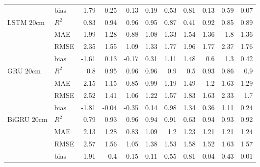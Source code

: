 \begin{tabular}{llrrrrrrrrr}
                                     & bias  & -1.79 & -0.25 & -0.13 & 0.19 & 0.53 &  0.81 & 0.13 & 0.59 &      0.07 \\
 LSTM 20cm                           & $R^2$ &  0.83 &  0.94 &  0.96 & 0.95 & 0.87 &  0.41 & 0.92 & 0.85 &      0.89 \\
                                     & MAE   &  1.99 &  1.28 &  0.88 & 1.08 & 1.33 &  1.54 & 1.36 & 1.8  &      1.36 \\
                                     & RMSE  &  2.35 &  1.55 &  1.09 & 1.33 & 1.77 &  1.96 & 1.77 & 2.37 &      1.76 \\
                                     & bias  & -1.61 &  0.13 & -0.17 & 0.31 & 1.11 &  1.48 & 0.6  & 1.3  &      0.42 \\
 GRU 20cm                            & $R^2$ &  0.8  &  0.95 &  0.96 & 0.96 & 0.9  &  0.5  & 0.93 & 0.86 &      0.9  \\
                                     & MAE   &  2.15 &  1.15 &  0.85 & 0.99 & 1.19 &  1.49 & 1.2  & 1.63 &      1.29 \\
                                     & RMSE  &  2.52 &  1.41 &  1.06 & 1.22 & 1.57 &  1.83 & 1.63 & 2.33 &      1.7  \\
                                     & bias  & -1.81 & -0.04 & -0.35 & 0.14 & 0.98 &  1.34 & 0.36 & 1.11 &      0.24 \\
 BiGRU 20cm                          & $R^2$ &  0.79 &  0.93 &  0.96 & 0.94 & 0.91 &  0.63 & 0.94 & 0.93 &      0.92 \\
                                     & MAE   &  2.13 &  1.28 &  0.83 & 1.09 & 1.2  &  1.23 & 1.21 & 1.21 &      1.24 \\
                                     & RMSE  &  2.57 &  1.56 &  1.05 & 1.38 & 1.53 &  1.58 & 1.52 & 1.63 &      1.57 \\
                                     & bias  & -1.91 & -0.4  & -0.15 & 0.11 & 0.55 &  0.81 & 0.04 & 0.43 &      0.01 \\
\hline
\end{tabular}